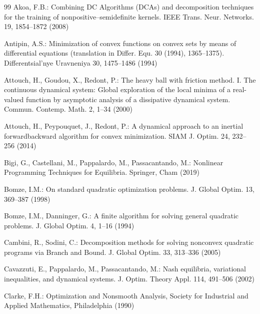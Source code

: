 \documentclass[11pt]{article}
\theoremstyle{definition}
\theoremstyle{remark}
\begin{document}
\begin{thebibliography}{99}
	 Akoa, F.B.: Combining DC Algorithms (DCAs) and decomposition techniques for the training of nonpositive–semidefinite kernels. IEEE Trans. Neur. Networks. 19, 1854--1872 (2008)  
	
	  Antipin, A.S.: Minimization of convex functions on convex sets by means of differential equations (translation in Differ. Equ. 30 (1994), 1365--1375). Differentsial'nye Uravneniya 30, 1475--1486 (1994)
	
	   Attouch, H., Goudou,  X.,  Redont, P.: The heavy ball with friction method. I. The continuous dynamical system: Global exploration of the local minima of a real-valued function by asymptotic analysis of a dissipative dynamical system. Commun. Contemp. Math. 2, 1--34 (2000)
	
	  Attouch, H.,  Peypouquet, J., Redont, P.: A dynamical approach to an inertial forwardbackward algorithm for convex minimization. SIAM J. Optim. 24, 232--256 (2014) 
	
	
	  Bigi, G., Castellani, M., Pappalardo, M., Passacantando, M.:
	Nonlinear Programming Techniques for Equilibria. Springer, Cham (2019) 
	
	  Bomze, I.M.: On standard quadratic optimization problems. J. Global Optim. 13, 369--387 (1998)
	
	 Bomze, I.M., Danninger, G.: A finite algorithm for solving general quadratic problems. J. Global Optim. 4, 1--16 (1994)
	
	  Cambini, R., Sodini, C.: Decomposition methods for solving nonconvex quadratic programs via Branch and Bound. J. Global Optim. 33, 313--336 (2005)
	
	 Cavazzuti, E., Pappalardo, M., Passacantando, M.: Nash equilibria, variational inequalities, and dynamical systems. J. Optim. Theory Appl. 114, 491--506 (2002)
	
	 Clarke, F.H.: Optimization and Nonsmooth Analysis, Society for Industrial and Applied Mathematics, Philadelphia (1990)
	
%	
	

\end{thebibliography}
\end{document}
